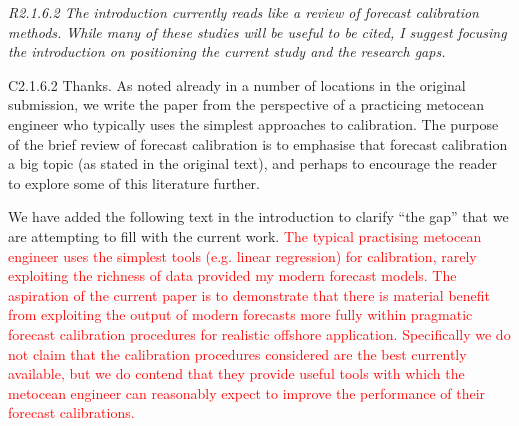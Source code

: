 \documentclass[a4paper,10pt]{article}
\newcommand{\ed}[1]{\textcolor{red}{#1}}
\begin{document}
	\emph{R2.1.6.2 The introduction currently reads like a review of forecast calibration methods. While many of these studies will be useful to be cited, I suggest focusing the introduction on positioning the current study and the research gaps.}
	
	C2.1.6.2 Thanks. As noted already in a number of locations in the original submission, we write the paper from the perspective of a practicing metocean engineer who typically uses the simplest approaches to calibration. The purpose of the brief review of forecast calibration is to emphasise that forecast calibration a big topic (as stated in the original text), and perhaps to encourage the reader to explore some of this literature further. 
	
	We have added the following text in the introduction to clarify ``the gap'' that we are attempting to fill with the current work. \ed{The typical practising metocean engineer uses the simplest tools (e.g. linear regression) for calibration, rarely exploiting the richness of data provided my modern forecast models. The aspiration of the current paper is to demonstrate that there is material benefit from exploiting the output of modern forecasts more fully within pragmatic forecast calibration procedures for realistic offshore application. Specifically we do not claim that the calibration procedures considered are the best currently available, but we do contend that they provide useful tools with which the metocean engineer can reasonably expect to improve the performance of their forecast calibrations.}
		
	
	
	
\end{document}
